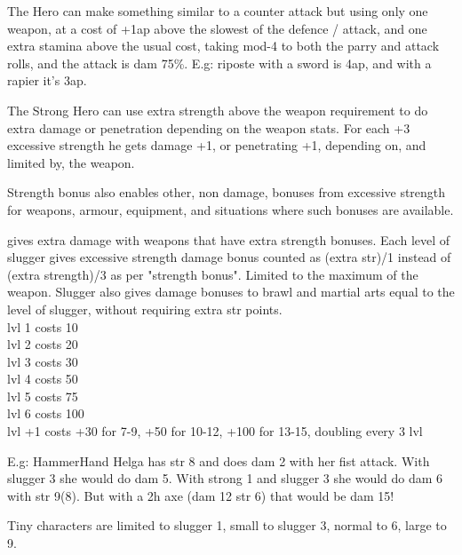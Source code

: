  The Hero can make something similar to a counter attack but using only one weapon, at a cost of +1ap above the slowest of the defence / attack, and one extra stamina above the usual cost, taking mod-4 to both the parry and attack rolls, and the attack is dam 75\%. E.g: riposte with a sword is 4ap, and with a rapier it's 3ap.


 The Strong Hero can use extra strength above the weapon requirement to do extra damage or penetration depending on the weapon stats. For each +3 excessive strength he gets damage +1, or penetrating +1, depending on, and limited by, the weapon.

Strength bonus also enables other, non damage, bonuses from excessive strength for weapons, armour, equipment, and situations where such bonuses are available.




 gives extra damage with weapons that have extra strength bonuses. Each level of slugger gives excessive strength damage bonus counted as (extra str)/1 instead of (extra strength)/3 as per "strength bonus". Limited to the maximum of the weapon. Slugger also gives damage bonuses to brawl and martial arts equal to the level of slugger, without requiring extra str points. \\
lvl  1  costs  10 \\
lvl  2  costs  20 \\
lvl  3  costs  30 \\
lvl  4  costs  50 \\
lvl  5  costs  75 \\
lvl  6  costs 100 \\
lvl +1  costs +30 for 7-9, +50 for 10-12, +100 for 13-15, doubling every 3 lvl

E.g: HammerHand Helga has str 8 and does dam 2 with her fist attack. With slugger 3 she would do dam 5. With strong 1 and slugger 3 she would do dam 6 with str 9(8). But with a 2h axe (dam 12 str 6) that would be dam 15!

Tiny characters are limited to slugger 1, small to slugger 3, normal to 6, large to 9.


